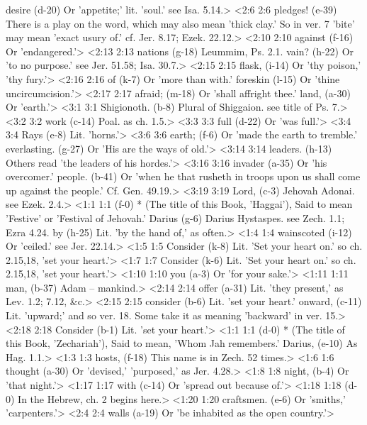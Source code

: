   desire (d-20)  Or 'appetite;' lit. 'soul.' see Isa. 5.14.>
<2:6 2:6  pledges! (e-39)  There is a play on the word, which may also mean 'thick  clay.' So in ver. 7 'bite' may mean 'exact usury of.' cf. Jer.  8.17; Ezek. 22.12.>
<2:10 2:10  against (f-16)  Or 'endangered.'>
<2:13 2:13  nations (g-18)  Leummim, Ps. 2.1.
  vain? (h-22)  Or 'to no purpose.' see Jer. 51.58; Isa. 30.7.>
<2:15 2:15  flask, (i-14)  Or 'thy poison,' 'thy fury.'>
<2:16 2:16  of (k-7)  Or 'more than with.'
  foreskin (l-15)  Or 'thine uncircumcision.'>
<2:17 2:17  afraid; (m-18)  Or 'shall affright thee.'
  land, (a-30)  Or 'earth.'>
<3:1 3:1  Shigionoth. (b-8)  Plural of Shiggaion. see title of Ps. 7.>
<3:2 3:2  work (c-14)  Poal. as ch. 1.5.>
<3:3 3:3  full (d-22)  Or 'was full.'>
<3:4 3:4  Rays (e-8)  Lit. 'horns.'>
<3:6 3:6  earth; (f-6)  Or 'made the earth to tremble.'
  everlasting. (g-27)  Or 'His are the ways of old.'>
<3:14 3:14  leaders. (h-13)  Others read 'the leaders of his hordes.'>
<3:16 3:16  invader (a-35)  Or 'his overcomer.'
  people. (b-41)  Or 'when he that rusheth in troops upon us shall come up  against the people.' Cf. Gen. 49.19.>
<3:19 3:19  Lord, (c-3)  Jehovah Adonai. see Ezek. 2.4.>
<1:1 1:1   (f-0)  * (The title of this Book, 'Haggai'), Said to mean 'Festive'  or 'Festival of Jehovah.'
  Darius (g-6)  Darius Hystaspes. see Zech. 1.1; Ezra 4.24.
  by (h-25)  Lit. 'by the hand of,' as often.>
<1:4 1:4  wainscoted (i-12)  Or 'ceiled.' see Jer. 22.14.>
<1:5 1:5  Consider (k-8) Lit. 'Set your heart on.' so ch. 2.15,18, 'set your heart.'>
<1:7 1:7  Consider (k-6)  Lit. 'Set your heart on.' so ch. 2.15,18, 'set your heart.'>
<1:10 1:10  you (a-3)  Or 'for your sake.'>
<1:11 1:11  man, (b-37)  Adam -- mankind.>
<2:14 2:14  offer (a-31)  Lit. 'they present,' as Lev. 1.2; 7.12, &c.>
<2:15 2:15  consider (b-6) Lit. 'set your heart.'
  onward, (c-11)  Lit. 'upward;' and so ver. 18. Some take it as meaning  'backward' in ver. 15.>
<2:18 2:18  Consider (b-1)  Lit. 'set your heart.'>
<1:1 1:1   (d-0)  * (The title of this Book, 'Zechariah'), Said to mean, 'Whom  Jah remembers.'
  Darius, (e-10)  As Hag. 1.1.>
<1:3 1:3  hosts, (f-18)  This name is in Zech. 52 times.>
<1:6 1:6  thought (a-30)  Or 'devised,' 'purposed,' as Jer. 4.28.>
<1:8 1:8  night, (b-4)  Or 'that night.'>
<1:17 1:17  with (c-14)  Or 'spread out because of.'>
<1:18 1:18   (d-0)  In the Hebrew, ch. 2 begins here.>
<1:20 1:20  craftsmen. (e-6)  Or 'smiths,' 'carpenters.'>
<2:4 2:4  walls (a-19)  Or 'be inhabited as the open country.'>
